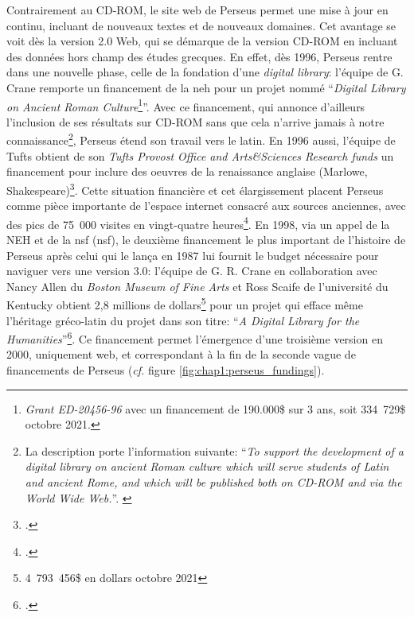 Contrairement au CD-ROM, le site web de Perseus permet une mise à jour en continu, incluant de nouveaux textes et de nouveaux domaines. Cet avantage se voit dès la version 2.0 Web, qui se démarque de la version CD-ROM en incluant des données hors champ des études grecques. En effet, dès 1996, Perseus rentre dans une nouvelle phase, celle de la fondation d'une \textit{digital library}: l'équipe de G. Crane remporte un financement de la \acrshort{neh} pour un projet nommé \enquote{\textit{Digital Library on Ancient Roman Culture}\footnote{\textit{Grant ED-20456-96} avec un financement de 190.000\$ sur 3 ans, soit 334~729\$ octobre 2021.}}. Avec ce financement, qui annonce d'ailleurs l'inclusion de ses résultats sur CD-ROM sans que cela n'arrive jamais à notre connaissance\footnote{La description porte l'information suivante: \enquote{\textit{To support the development of a digital library on ancient Roman culture which will serve students of Latin and ancient Rome, and which will be published both on CD-ROM and via the World Wide Web.}}. \cite{noauthor_neh_nodate}}, Perseus étend son travail vers le latin. En 1996 aussi, l'équipe de Tufts obtient de son \textit{Tufts Provost Office and Arts\&Sciences Research funds} un financement pour inclure des oeuvres de la renaissance anglaise (Marlowe, Shakespeare)\footcite{crane_perseus_1998}. Cette situation financière et cet élargissement placent Perseus comme pièce importante de l'espace internet consacré aux sources anciennes, avec des pics de 75~000 visites en vingt-quatre heures\footcite{crane_digital_1998}. En 1998, via un appel de la NEH et de la \acrfull{nsf} (\acrshort{nsf}), le deuxième financement le plus important de l'histoire de Perseus après celui qui le lança en 1987 lui fournit le budget nécessaire pour naviguer vers une version 3.0: l'équipe de G. R. Crane en collaboration avec Nancy Allen du \textit{Boston Museum of Fine Arts} et Ross Scaife de l'université du Kentucky obtient 2,8 millions de dollars\footnote{4~793~456\$ en dollars octobre 2021} pour un projet qui efface même l'héritage gréco-latin du projet dans son titre: \enquote{\textit{A Digital Library for the Humanities}}\footcite{crane_digital_1998}. Ce financement permet l'émergence d'une troisième version en 2000, uniquement web, et correspondant à la fin de la seconde vague de financements de Perseus (\textit{cf.} figure \ref{fig:chap1:perseus_fundings}).


